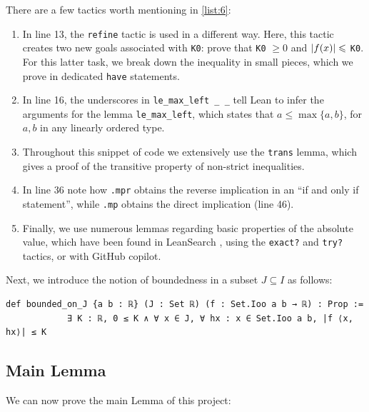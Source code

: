 \documentclass[a4paper,11pt]{article}
\theoremstyle{plain}
\newcommand{\R}{\ensuremath{\mathbb{R}}} %
\begin{document}
	There are a few tactics worth mentioning in \cref{list:6}:
	\begin{enumerate}
		\item In line 13, the \lstinline|refine| tactic is used in a different way. Here, this tactic creates two new goals associated with \lstinline|K0|: prove that \lstinline|K0| $\geqslant 0$ and $\abs{f(x)}\leqslant$ \lstinline|K0|. For this latter task, we break down the inequality in small pieces, which we prove in dedicated \lstinline|have| statements.
		\item In line 16, the underscores in \lstinline|le_max_left _ _| tell Lean to infer the arguments for the lemma \lstinline|le_max_left|, which states that $a\leqslant \max\{a,b\}$, for $a,b$ in any linearly ordered type.
		\item Throughout this snippet of code we extensively use the \lstinline|trans| lemma, which gives a proof of the transitive property of non-strict inequalities.
		\item In line 36 note how \lstinline|.mpr| obtains the reverse implication in an ``if and only if statement'', while \lstinline|.mp| obtains the direct implication (line 46).
		\item Finally, we use numerous lemmas regarding basic properties of the absolute value, which have been found in LeanSearch \cite{LeanSearch}, using the \lstinline|exact?| and \lstinline|try?| tactics, or with GitHub copilot.
	\end{enumerate}
	
	Next, we introduce the notion of boundedness in a subset $J\subseteq I$ as follows:\\
	
	\begin{lstlisting}[caption={Boundedness of $f:J\subseteq I\to\R$.}, label={list:7}]
		def bounded_on_J {a b : ℝ} (J : Set ℝ) (f : Set.Ioo a b → ℝ) : Prop :=
			∃ K : ℝ, 0 ≤ K ∧ ∀ x ∈ J, ∀ hx : x ∈ Set.Ioo a b, |f ⟨x, hx⟩| ≤ K
	\end{lstlisting}
	
	\subsection{Main Lemma}

	We can now prove the main Lemma of this project:\\
	
\end{document}
